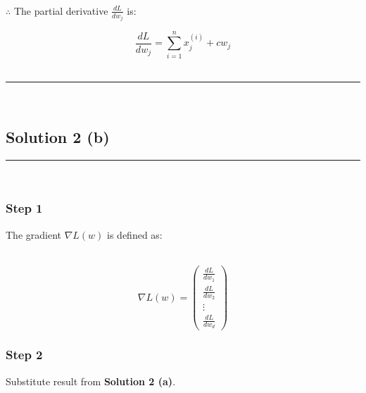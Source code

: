 \documentclass{article}
\begin{document}
\subsubsection*{\normalfont}{$\therefore$ The partial derivative $\frac{dL}{dw_j}$ is:}

$$\frac{dL}{dw_j} = \sum_{i=1}^{n} x_j^{(i)} + cw_j$$\\

\noindent\rule{\textwidth}{0.4pt}\\

\newpage

\subsection*{Solution 2 (b)}
\noindent\rule{\textwidth}{0.4pt}\\

\subsubsection*{Step 1}
\parbox{\textwidth}{
The gradient $\nabla L(w)$ is defined as:
}\\

$$\nabla L(w) = \begin{pmatrix} 
\frac{dL}{dw_1} \\
\frac{dL}{dw_2} \\
\vdots \\
\frac{dL}{dw_d}
\end{pmatrix}$$

\subsubsection*{Step 2}
\parbox{\textwidth}{Substitute result from \textbf{Solution 2 (a)}.
}\\
\end{document}
